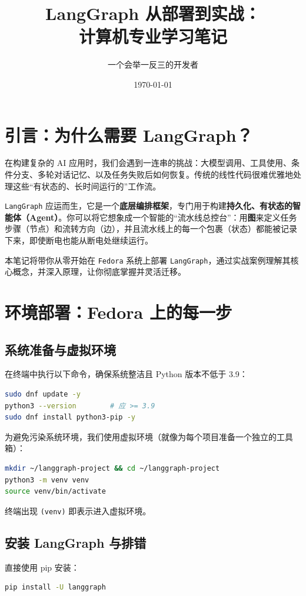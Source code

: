 \documentclass[12pt,a4paper]{ctexart}
\title{\textbf{LangGraph 从部署到实战：\\计算机专业学习笔记}}
\author{一个会举一反三的开发者}
\date{\today}
\newcommand{\langgraph}{\texttt{LangGraph}}
\newcommand{\fedora}{\texttt{Fedora}}
\begin{document}
\maketitle
\tableofcontents
\newpage

\section{引言：为什么需要 LangGraph？}

在构建复杂的 AI 应用时，我们会遇到一连串的挑战：大模型调用、工具使用、条件分支、多轮对话记忆、以及任务失败后如何恢复。传统的线性代码很难优雅地处理这些“有状态的、长时间运行的”工作流。

\langgraph{} 应运而生，它是一个\textbf{底层编排框架}，专门用于构建\textbf{持久化、有状态的智能体（Agent）}。你可以将它想象成一个智能的“流水线总控台”：用\textbf{图}来定义任务步骤（节点）和流转方向（边），并且流水线上的每一个包裹（状态）都能被记录下来，即使断电也能从断电处继续运行。

本笔记将带你从零开始在 \fedora{} 系统上部署 \langgraph{}，通过实战案例理解其核心概念，并深入原理，让你彻底掌握并灵活迁移。

\section{环境部署：Fedora 上的每一步}
\label{sec:deploy}

\subsection{系统准备与虚拟环境}
在终端中执行以下命令，确保系统整洁且 Python 版本不低于 3.9：
\begin{lstlisting}[language=bash]
sudo dnf update -y
python3 --version        # 应 >= 3.9
sudo dnf install python3-pip -y
\end{lstlisting}

为避免污染系统环境，我们使用虚拟环境（就像为每个项目准备一个独立的工具箱）：
\begin{lstlisting}[language=bash]
mkdir ~/langgraph-project && cd ~/langgraph-project
python3 -m venv venv
source venv/bin/activate
\end{lstlisting}
终端出现 \texttt{(venv)} 即表示进入虚拟环境。

\subsection{安装 LangGraph 与排错}
直接使用 pip 安装：
\begin{lstlisting}[language=bash]
pip install -U langgraph
\end{lstlisting}
\end{document}
